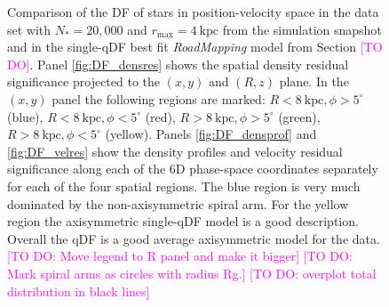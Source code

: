 \documentclass[iop,revtex4,numberedappendix,appendixfloats]{emulateapj}
\newcommand{\RM}{{\sl RoadMapping}}
\newcommand{\Wilma}[1]{\textcolor{Magenta}{#1}}
\begin{document}
\begin{figure}[!htbp]
  \centering
  \caption{Comparison of the DF of stars in position-velocity space in the data set with $N_*=20,000$ and $r_\text{max}=4~\text{kpc}$ from the simulation snapshot and in the single-qDF best fit \RM{} model from Section \Wilma{[TO DO]}. Panel \ref{fig:DF_densres} shows the spatial density residual significance projected to the $(x,y)$ and $(R,z)$ plane. In the $(x,y)$ panel the following regions are marked: $R<8~\text{kpc},\phi>5^\circ$ (blue), $R<8~\text{kpc},\phi<5^\circ$ (red), $R>8~\text{kpc},\phi>5^\circ$ (green), $R>8~\text{kpc},\phi<5^\circ$ (yellow). Panels \ref{fig:DF_densprof} and \ref{fig:DF_velres} show the density profiles and velocity residual significance along each of the 6D phase-space coordinates separately for each of the four spatial regions. The blue region is very much dominated by the non-axisymmetric spiral arm. For the yellow region the axisymmetric single-qDF model is a good description. Overall the qDF is a good average axisymmetric model for the data. \Wilma{[TO DO: Move legend to R panel and make it bigger]} \Wilma{[TO DO: Mark spiral arms as circles with radius Rg.]} \Wilma{[TO DO: overplot total distribution in black lines]}}
  \label{fig:4kpc8Spiral_DF_comparison}
\end{figure}
\end{document}
